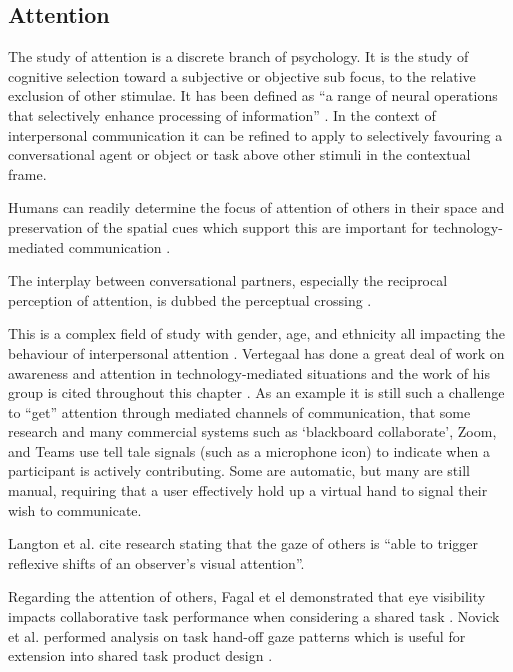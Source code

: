 \subsection{Attention}
The study of attention is a discrete branch of psychology. It is the study of cognitive selection toward a subjective or objective sub focus, to the relative exclusion of other stimulae. It has been defined as ``a range of neural operations that selectively enhance processing of information'' \cite{Carlston2013}. In the context of interpersonal communication it can be refined to apply to selectively favouring a conversational agent or object or task above other stimuli in the contextual frame.\par
Humans can readily determine the focus of attention of others in their space \cite{Stiefelhagen2001} and preservation of the spatial cues which support this are important for technology-mediated communication \cite{Sellen1992} \cite{Stiefelhagen2002}.\par
The interplay between conversational partners, especially the reciprocal perception of attention, is dubbed the perceptual crossing \cite{Deckers2013, Gibson1963}.\par
This is a complex field of study with gender, age, and ethnicity all impacting the behaviour of interpersonal attention \cite{Bente1998, Slessor2008, Argyle1988, Hofmann2006, Pan2008}.
Vertegaal has done a great deal of work on awareness and attention in technology-mediated situations and the work of his group is cited throughout this chapter \cite{Vertegaal1997}. As an example it is still such a challenge to ``get'' attention through mediated channels of communication, that some research \cite{Fels2000, Sellen1992} and many commercial systems such as `blackboard collaborate', Zoom, and Teams use tell tale signals (such as a microphone icon) to indicate when a participant is actively contributing. Some are automatic, but many are still manual, requiring that a user effectively hold up a virtual hand to signal their wish to communicate.\par
Langton et al. cite research stating that the gaze of others is ``able to trigger reflexive shifts of an observer's visual attention''. \par 
Regarding the attention of others, Fagal et el demonstrated that eye visibility impacts collaborative task performance when considering a shared task \cite{Fagel2010}. Novick et al. performed analysis on task hand-off gaze patterns which is useful for extension into shared task product design \cite{Novick1996}. 

